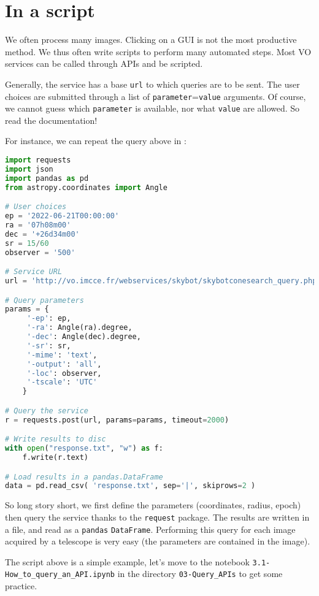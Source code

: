 



\section{In a script}

We often process many images. Clicking on a GUI is not the most
productive method. We thus often write scripts to perform
many automated steps. Most VO services can be called through APIs
and be scripted.

Generally, the service has a base \texttt{url} to which queries are
to be sent. The user choices are submitted through a list of \texttt{parameter}=\texttt{value}
arguments. Of course, we cannot guess which \texttt{parameter} is
available, nor what \texttt{value} are allowed. So read the documentation!

For instance, we can repeat the query above in \python:

\begin{lstlisting}[language=python]
import requests
import json
import pandas as pd
from astropy.coordinates import Angle

# User choices
ep = '2022-06-21T00:00:00'
ra = '07h08m00'
dec = '+26d34m00'
sr = 15/60
observer = '500'

# Service URL
url = 'http://vo.imcce.fr/webservices/skybot/skybotconesearch_query.php?'

# Query parameters
params = {
     '-ep': ep,
     '-ra': Angle(ra).degree,
     '-dec': Angle(dec).degree,
     '-sr': sr,
     '-mime': 'text',
     '-output': 'all',
     '-loc': observer, 
     '-tscale': 'UTC'
    }

# Query the service
r = requests.post(url, params=params, timeout=2000)

# Write results to disc
with open("response.txt", "w") as f:
    f.write(r.text)

# Load results in a pandas.DataFrame
data = pd.read_csv( 'response.txt', sep='|', skiprows=2 )
\end{lstlisting}

  So long story short, we first
  define the parameters (coordinates, radius, epoch) then query the
  \skybot service thanks to the \texttt{request} package. The results
  are written in a file, and read as a \texttt{pandas} \texttt{DataFrame}.
  Performing this query for each image acquired by a telescope is very easy
  (the parameters are contained in the image).

The script above is a simple example, let's move to the notebook
\texttt{3.1-How\_to\_query\_an\_API.ipynb} in the directory 
\texttt{03-Query\_APIs} to get some practice.


